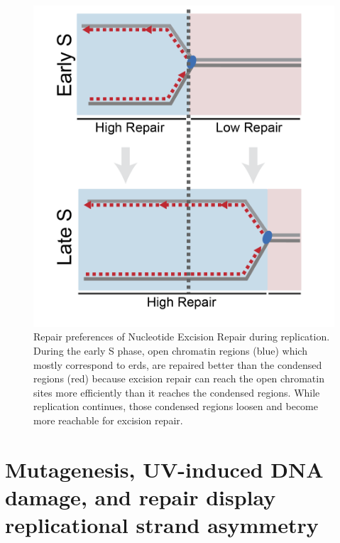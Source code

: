 \begin{figure}[H]
    \begin{center}
    \includegraphics[width=\textwidth]{Chapters/5_discussion/figures/model}
    \caption[Repair preferences of Nucleotide Excision Repair during replication.]{Repair preferences of Nucleotide Excision Repair during replication. During the early S phase, open chromatin regions (blue) which mostly correspond to \gls{erd}s, are repaired better than the condensed regions (red) because excision repair can reach the open chromatin sites more efficiently than it reaches the condensed regions. While replication continues, those condensed regions loosen and become more reachable for excision repair.}
    \label{fig:model}
    \end{center}
    \end{figure}

\section{Mutagenesis, UV-induced DNA damage, and repair display replicational strand asymmetry}

